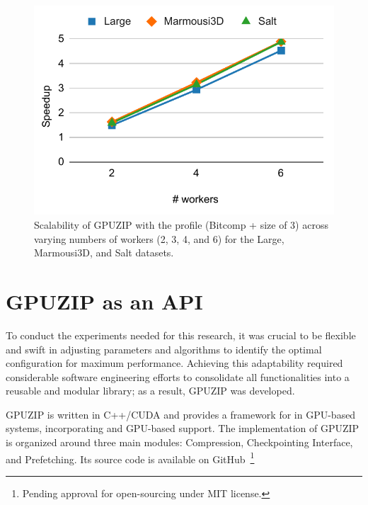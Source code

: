 \documentclass[Ingles]{ic-tese-v3}
\begin{document}
\begin{figure}[h!]
    \centering
    \includegraphics[width=0.7\linewidth,trim={5 10 0 10},clip]{figures/scalability.pdf}
    \caption[Speedup scalability in MNMG (\checkpointprefetching + \compression)]{Scalability of GPUZIP with the \revolve profile (Bitcomp + \cache size of 3) across varying numbers of workers (2, 3, 4, and 6) for the Large, Marmousi3D, and Salt datasets.}
    \label{fig:scalability}
\end{figure}

\chapter{GPUZIP as an API}
\label{ch:oss}

To conduct the experiments needed for this research, it was crucial to be flexible and swift in adjusting \compression parameters and algorithms to identify the optimal configuration for maximum performance. Achieving this adaptability required considerable software engineering efforts to consolidate all functionalities into a reusable and modular library; as a result, GPUZIP was developed.

GPUZIP is written in C++/CUDA and provides a framework for \checkpointing in GPU-based systems, incorporating \checkpointprefetching and GPU-based \compression support. The implementation of GPUZIP is organized around three main modules: Compression, Checkpointing Interface, and Prefetching. Its source code is available on GitHub~\cite{githubrepo}\footnote{Pending approval for open-sourcing under MIT license.}
\end{document}
